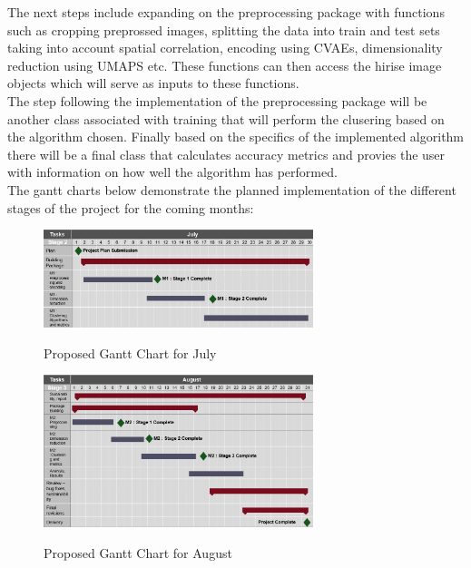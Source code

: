 \documentclass[project-plan]{report-template}
\begin{document}
 The next steps include expanding on the preprocessing package with functions such as cropping preprossed images, splitting the data into train and test sets taking into account spatial correlation, encoding using CVAEs, dimensionality reduction using UMAPS etc. These functions can then access the hirise image objects which will serve as inputs to these functions.\\
 The step following the implementation of the preprocessing package will be another class associated with training that will perform the clusering based on the algorithm chosen. Finally based on the specifics of the implemented algorithm there will be a final class that calculates accuracy metrics and provies the user with information on how well the algorithm has performed. \\

 The gantt charts below demonstrate the planned implementation of the different stages of the project for the coming months: \\

\begin{figure}[htp]
    \begin{center}
        \includegraphics[width=0.7\textwidth]{gantt-july.png}
        \caption{}{Proposed Gantt Chart for July} 
    \end{center}
\end{figure}

\begin{figure}[htp]
    \begin{center}
        \includegraphics[width=0.7\textwidth]{gantt-august.png}
        \caption{}{Proposed Gantt Chart for August} 
    \end{center}
\end{figure}


\nocite{*}

\end{document}
